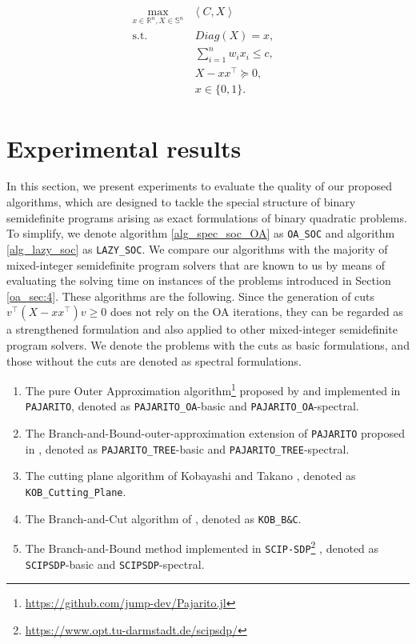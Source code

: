 \documentclass{article}
\begin{document}
\begin{gather}\label{qkp_sdp}\tag{QKSDP}   
\begin{aligned}
\max_{x \in \mathbb{R}^n, X\in \mathbb{S}^n} & \left \langle C,X \right \rangle \\
    \text{s.t. } & \ Diag(X) =  x, \\ 
    & \ \sum_{i=1}^n w_ix_i \leq c,\\
    & \ X-xx^\top  \succeq 0, & \\
    & \ x \in \{0,1\}.
\end{aligned}
\end{gather}



\section{Experimental results}\label{oa_sec:5}

In this section, we present experiments to evaluate the quality of our proposed algorithms, which are designed to tackle the special structure of binary semidefinite programs arising as exact formulations of binary quadratic problems. To simplify, we denote algorithm \ref{alg_spec_soc_OA} as \texttt{OA\_SOC} and algorithm \ref{alg_lazy_soc} as \texttt{LAZY\_SOC}.
We compare our algorithms with the majority of mixed-integer semidefinite program solvers that are known to us by means of evaluating the solving time on instances of the problems introduced in Section \ref{oa_sec:4}. These algorithms are the following. Since the generation of cuts $ v^\top \left  (X-xx^\top\right)v \geq 0$ does not rely on the OA iterations, they can be regarded as a strengthened formulation and also applied to other mixed-integer semidefinite program solvers. We denote the problems with the cuts as basic formulations, and those without the cuts are denoted as spectral formulations.

\begin{enumerate}
    \item The pure Outer Approximation algorithm\footnote{ \url{https://github.com/jump-dev/Pajarito.jl}} proposed by \cite{lubin2018polyhedral} and implemented in \texttt{PAJARITO}, denoted as \texttt{PAJARITO\_OA}-basic and \texttt{PAJARITO\_OA}-spectral.


    \item The Branch-and-Bound-outer-approximation extension of \texttt{PAJARITO} proposed in \cite{coey2020outer}, denoted as \texttt{PAJARITO\_TREE}-basic and \texttt{PAJARITO\_TREE}-spectral.

    \item The cutting plane algorithm of Kobayashi and Takano \cite{kobayashi2020branch}, denoted as \texttt{KOB\_Cutting\_Plane}.

    \item The Branch-and-Cut algorithm of \citet{kobayashi2020branch}, denoted as \texttt{KOB\_B\&C}.

    \item The Branch-and-Bound method implemented in \texttt{SCIP-SDP}\footnote{\url{https://www.opt.tu-darmstadt.de/scipsdp/}} \cite{gally2018framework}, denoted as \texttt{SCIPSDP}-basic and \texttt{SCIPSDP}-spectral.
\end{enumerate}
\end{document}
